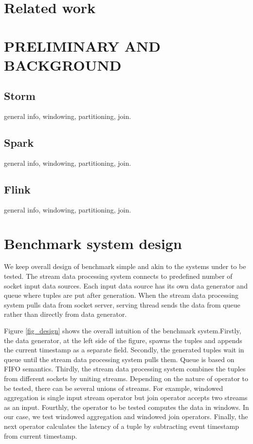 \documentclass{vldb}
\begin{document}
\section{Related work}

\section{PRELIMINARY AND BACKGROUND}
\subsection{Storm}
general info, windowing, partitioning, join.
\subsection{Spark}
general info, windowing, partitioning, join.
\subsection{Flink}
general info, windowing, partitioning, join.


\section{Benchmark system design}
We keep overall design of benchmark simple and akin to the systems under to be tested.  
The stream data processing system connects to predefined number of socket input data sources. Each input data source has its own data generator and queue where tuples are put after generation. When the stream data processing system pulls  data from socket server, serving thread sends the data from queue rather than  directly from data generator. 

Figure \ref{fig_design} shows the overall intuition of the benchmark system.Firstly, the data generator, at the left side of the figure, spawns the tuples and appends the current timestamp as a separate field. Secondly, the generated tuples wait in queue until the stream data processing system pulls them. Queue is based on FIFO semantics. Thirdly, the stream data processing system combines the tuples from different sockets by uniting streams. Depending on the nature of operator to be tested, there can be several unions of streams. For example, windowed aggregation is single input stream operator but join operator accepts two streams as an input. Fourthly, the operator to be tested computes the data in windows. In our case, we test windowed aggregation and windowed join operators. Finally, the next operator calculates the latency of a tuple by subtracting event timestamp from current timestamp.
\end{document}
